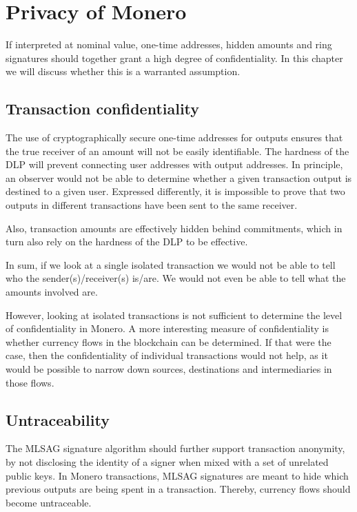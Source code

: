 

\chapter{Privacy of Monero}
\label{chapter:privacy}

If interpreted at nominal value, one-time addresses, hidden amounts and ring signatures should together grant
a high degree of confidentiality.
In this chapter we will discuss whether this is a warranted assumption.


\section{Transaction confidentiality}

The use of cryptographically secure one-time addresses for outputs ensures that the true receiver of an amount will not be easily identifiable. The hardness of the DLP will prevent connecting user addresses with output addresses. In principle, an observer
would not be able to determine whether a given transaction output is destined to a given user.
Expressed differently, it is impossible to prove that two outputs in different transactions have been sent to the same receiver.

Also, transaction amounts are effectively hidden behind commitments, which in turn also rely on the hardness of the DLP to be effective.

In sum, if we look at a single isolated transaction we would not be able to tell who the sender(s)/receiver(s) is/are.
We would not even be able to tell what the amounts involved are.

However, looking at isolated transactions is not sufficient to determine the level of confidentiality in Monero.
A more interesting measure of confidentiality is whether currency flows in the blockchain can be determined.
If that were the case, then the confidentiality of individual transactions would not help, as it would be possible
to narrow down sources, destinations and intermediaries in those flows.



\section{Untraceability}
\label{sec:untraceability}

The MLSAG signature algorithm should further support  transaction anonymity, by not disclosing the identity of a signer
when mixed with a set of unrelated public keys.
In Monero transactions, MLSAG signatures are meant to hide which previous outputs are being spent
in a transaction. Thereby, currency flows should become untraceable.
\\

